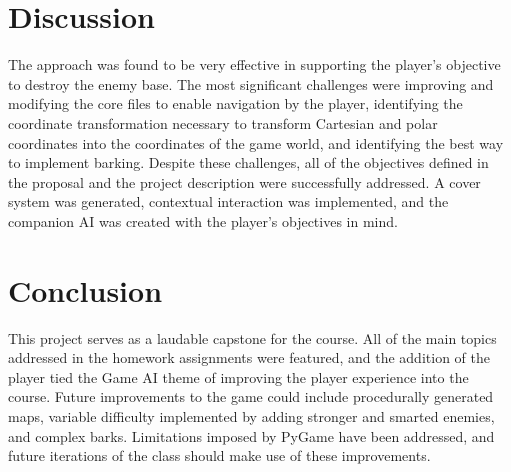 \documentclass[11pt]{article}
\begin{document}
\section{Discussion}
The approach was found to be very effective in supporting the player's objective to destroy the enemy base. The most significant challenges were improving and modifying the core files to enable navigation by the player, identifying the coordinate transformation necessary to transform Cartesian and polar coordinates into the coordinates of the game world, and identifying the best way to implement barking. Despite these challenges, all of the objectives defined in the proposal and the project description were successfully addressed. A cover system was generated, contextual interaction was implemented, and the companion AI was created with the player's objectives in mind.

\section{Conclusion}
This project serves as a laudable capstone for the course. All of the main topics addressed in the homework assignments were featured, and the addition of the player tied the Game AI theme of improving the player experience into the course. Future improvements to the game could include procedurally generated maps, variable difficulty implemented by adding stronger and smarted enemies, and complex barks. Limitations imposed by PyGame have been addressed, and future iterations of the class should make use of these improvements.
\end{document}
